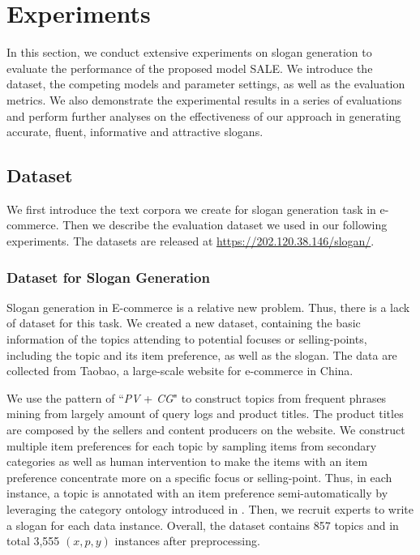 \section{Experiments}
\label{sec:experiments}
In this section, we conduct
extensive experiments on slogan generation 
to evaluate the performance
of the proposed model SALE.
We introduce the dataset, 
the competing models and parameter settings,
as well as the evaluation metrics.
We also demonstrate the experimental results in a series of evaluations
and perform further analyses on the effectiveness of our approach
in generating accurate, fluent, informative and attractive slogans.

\subsection{Dataset}
\label{sec:dataset}
We first introduce the text corpora we create
for slogan generation task in e-commerce.
Then we describe the evaluation dataset we used in
our following experiments.
The datasets are released at \url{https://202.120.38.146/slogan/}.

\subsubsection{Dataset for Slogan Generation}
\label{sec:corpora}
Slogan generation in E-commerce is a relative new problem.
Thus, there is a lack of dataset for this task.
We created a new dataset, containing 
the basic information of the topics attending to potential focuses or selling-points,
including the topic and its item preference, as well as the slogan.
The data are collected from Taobao, a large-scale website for e-commerce in China.

We use the pattern of ``\emph{PV} + \emph{CG}" 
to construct topics from frequent phrases mining from largely amount
of query logs and product titles.
The product titles are composed by the sellers and content producers on the
website.
We construct multiple item preferences for each topic by sampling items from 
secondary categories as well as human intervention to 
make the items with an item preference concentrate more on a specific focus 
or selling-point.
Thus, in each instance, a topic is annotated with an item preference semi-automatically
by leveraging the category ontology introduced in .
Then, we recruit experts to write a slogan for each data instance.
Overall, the dataset contains 857 topics and 
in total 3,555 $(x, p, y)$ instances after preprocessing.

